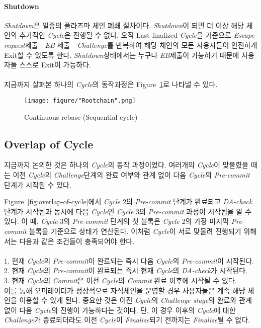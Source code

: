 \documentclass[letterpaper, 11pt]{article}
\begin{document}
\paragraph{Shutdown}
\begin{CJK}{UTF8}{mj}
\emph{Shutdown}은 일종의 플라즈마 체인 폐쇄 절차이다. \emph{Shutdown}이 되면 더 이상 해당 체인의 추가적인 \emph{Cycle}은 진행될 수 없다. 오직 Last finalized \emph{Cycle}을 기준으로 \emph{Escape request}제출 - \emph{EB} 제출 - \emph{Challenge}를 반복하여 해당 체인의 모든 사용자들이 안전하게 Exit할 수 있도록 한다. \emph{Shutdown}상태에서는 누구나 \emph{EB}제출이 가능하기 때문에 사용자들 스스로 Exit이 가능하다. \\
\\
지금까지 살펴본 하나의 \emph{Cycle}의 동작과정은 Figure~\ref{fig:continuouse-rebase}로 나타낼 수 있다.


\begin{figure}[!h]
\centering
\texttt{[image: figure/"Rootchain".png]}
\caption{Continuous rebase (Sequential cycle)}
\label{fig:continuouse-rebase}
\end{figure}

\end{CJK}

\subsection{Overlap of Cycle} \label{subsec:overlap}
\begin{CJK}{UTF8}{mj}
지금까지 논의한 것은 하나의 \emph{Cycle}의 동작 과정이었다. 여러개의 \emph{Cycle}이 맞물렸을 때는 이전 \emph{Cycle}의 \emph{Challenge}단계의 완료 여부와 관계 없이 다음 \emph{Cycle}의 \emph{Pre-commit} 단계가 시작될 수 있다.

Figure~\ref{fig:overlap-of-cycle}에서 \emph{Cycle} 2의 \emph{Pre-commit} 단계가 완료되고 \emph{DA-check} 단계가 시작됨과 동시에 다음 \emph{Cycle}인 \emph{Cycle} 3의 \emph{Pre-commit} 과정이 시작됨을 알 수 있다. 이 때, \emph{Cycle} 3의 \emph{Pre-commit} 단계의 첫 블록은 \emph{Cycle} 2의 가장 마지막 \emph{Pre-commit} 블록을 기준으로 상태가 연산된다. 이처럼 \emph{Cycle}이 서로 맞물려 진행되기 위해서는 다음과 같은 조건들이 충족되어야 한다. \\
\\
1. 현재 \emph{Cycle}의 \emph{Pre-commit}이 완료되는 즉시 다음 \emph{Cycle}의 \emph{Pre-commit}이 시작된다. \\
2. 현재 \emph{Cycle}의 \emph{Pre-commit}이 완료되는 즉시 현재 \emph{Cycle}의 \emph{DA-check}가 시작된다. \\
3. 현재 \emph{Cycle}의 \emph{Commit}은 이전 \emph{Cycle}의 \emph{Commit} 완료 이후에 시작될 수 있다. \\

이를 통해 오퍼레이터가 정상적으로 자식체인을 운영할 경우 사용자들은 계속 해당 체인을 이용할 수 있게 된다. 중요한 것은 이전 \emph{Cycle}의 \emph{Challenge stage}의 완료와 관계 없이 다음 \emph{Cycle}의 진행이 가능하다는 것이다. 단, 이 경우 이후의 \emph{Cycle}에 대한 \emph{Challenge}가 종료되더라도 이전 \emph{Cycle}이 \emph{Finalize}되기 전까지는 \emph{Finalize}될 수 없다.
\end{CJK}
\end{document}
